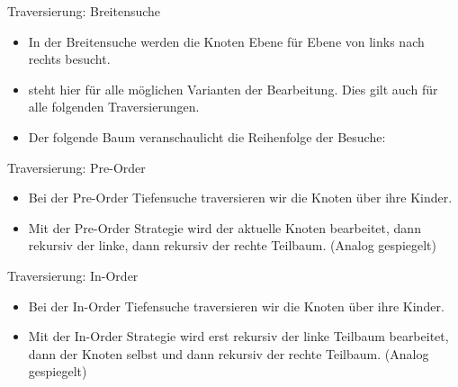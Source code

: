 \begin{frame}{Traversierung: Breitensuche}
    \begin{itemize}[<+(1)->]
        \item In der Breitensuche werden die Knoten Ebene für Ebene von links nach rechts besucht.
        \item {} steht hier für alle möglichen Varianten der Bearbeitung. Dies gilt auch für alle folgenden Traversierungen.
        \item Der folgende Baum veranschaulicht die Reihenfolge der Besuche:
    \end{itemize}
    \pause{}\begin{center}
    \end{center}
\end{frame}

\begin{frame}{Traversierung: Pre-Order}
    \begin{itemize}[<+(1)->]
        \item Bei der Pre-Order Tiefensuche traversieren wir die Knoten über ihre Kinder.
        \item Mit der Pre-Order Strategie wird der aktuelle Knoten bearbeitet, dann rekursiv der linke, dann rekursiv der rechte Teilbaum.\pause{} (Analog gespiegelt)
    \end{itemize}
    \pause{}\begin{center}
    \end{center}
\end{frame}


\begin{frame}{Traversierung: In-Order}
    \begin{itemize}[<+(1)->]
        \item Bei der In-Order Tiefensuche traversieren wir die Knoten über ihre Kinder.
        \item Mit der In-Order Strategie wird erst rekursiv der linke Teilbaum bearbeitet, dann der Knoten selbst und dann rekursiv der rechte Teilbaum.\pause{} (Analog gespiegelt)
    \end{itemize}
    \pause{}\begin{center}
    \end{center}
\end{frame}

